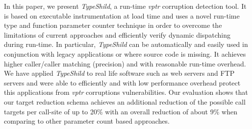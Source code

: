 In this paper, we present \textit{TypeShild}, a run-time \textit{vptr} corruption
detection tool. It is based on executable instrumentation at load time
and uses a novel run-time type and function parameter counter technique
in order to overcome the limitations of current approaches and efficiently
verify dynamic dispatching during run-time.
In particular, \textit{TypeShild} can be automatically and easily used
in conjunction with legacy applications or where source code is missing.
It achieves higher caller/caller matching (precision) and with reasonable
run-time overhead.
We have applied \textit{TypeShild} to real life software such as
web servers and FTP servers and were able to efficiently
and with low performance overhead protect this applications from 
\textit{vptr} corruptions vulnerabilities.
Our evaluation shows that our target reduction schema achieves an additional
reduction of the possible call targets per call-site of up to 
20\% with an overall reduction of about 9\% when comparing to other
parameter count based approaches.
